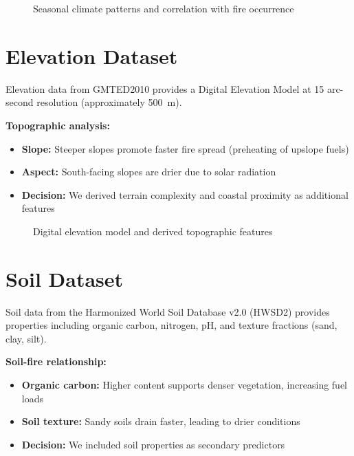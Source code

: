 \begin{figure}[H]
    \centering
    \caption{Seasonal climate patterns and correlation with fire occurrence}
    \label{fig:climate}
\end{figure}

\section{Elevation Dataset}
Elevation data from GMTED2010 provides a Digital Elevation Model at 15 arc-second resolution (approximately 500~m).

\textbf{Topographic analysis:}
\begin{itemize}
    \item \textbf{Slope:} Steeper slopes promote faster fire spread (preheating of upslope fuels)
    \item \textbf{Aspect:} South-facing slopes are drier due to solar radiation
    \item \textbf{Decision:} We derived terrain complexity and coastal proximity as additional features
\end{itemize}

\begin{figure}[H]
    \centering
    \caption{Digital elevation model and derived topographic features}
    \label{fig:elevation}
\end{figure}

\section{Soil Dataset}
Soil data from the Harmonized World Soil Database v2.0 (HWSD2) provides properties including organic carbon, nitrogen, pH, and texture fractions (sand, clay, silt).

\textbf{Soil-fire relationship:}
\begin{itemize}
    \item \textbf{Organic carbon:} Higher content supports denser vegetation, increasing fuel loads
    \item \textbf{Soil texture:} Sandy soils drain faster, leading to drier conditions
    \item \textbf{Decision:} We included soil properties as secondary predictors
\end{itemize}

